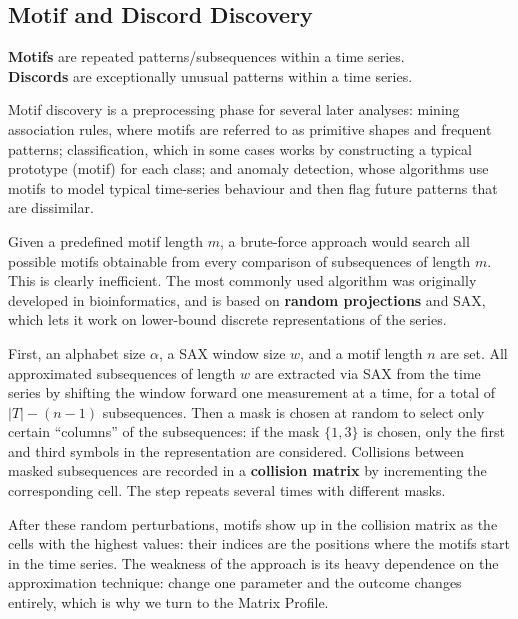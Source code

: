 \subsection{Motif and Discord Discovery}
\begin{definition}
\textbf{Motifs} are repeated patterns/subsequences within a time series. \\ \textbf{Discords} are exceptionally unusual patterns within a time series.
\end{definition}
Motif discovery is a preprocessing phase for several later analyses: mining association rules, where motifs are referred to as primitive shapes and frequent patterns; classification, which in some cases works by constructing a typical prototype (motif) for each class; and anomaly detection, whose algorithms use motifs to model typical time-series behaviour and then flag future patterns that are dissimilar.

Given a predefined motif length $m$, a brute-force approach would search all possible motifs obtainable from every comparison of subsequences of length $m$. This is clearly inefficient. The most commonly used algorithm was originally developed in bioinformatics, and is based on \textbf{random projections} and SAX, which lets it work on lower-bound discrete representations of the series.

First, an alphabet size $\alpha$, a SAX window size $w$, and a motif length $n$ are set. All approximated subsequences of length $w$ are extracted via SAX from the time series by shifting the window forward one measurement at a time, for a total of $|T| - (n - 1)$ subsequences. Then a mask is chosen at random to select only certain ``columns'' of the subsequences: if the mask $\{1,3\}$ is chosen, only the first and third symbols in the representation are considered. Collisions between masked subsequences are recorded in a \textbf{collision matrix} by incrementing the corresponding cell. The step repeats several times with different masks.

After these random perturbations, motifs show up in the collision matrix as the cells with the highest values: their indices are the positions where the motifs start in the time series. The weakness of the approach is its heavy dependence on the approximation technique: change one parameter and the outcome changes entirely, which is why we turn to the Matrix Profile.

